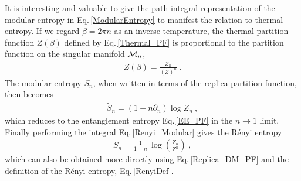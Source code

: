 It is interesting and valuable to give the path integral representation of the modular entropy in Eq.\,\eqref{ModularEntropy} to manifest the relation to thermal entropy.
If we regard $\beta = 2\pi n$ as an inverse temperature, the thermal partition function $Z(\beta)$ defined by Eq.\,\eqref{Thermal_PF} is proportional to the partition function on the singular manifold ${\cal M}_n$,
\begin{align}
	Z(\beta) = \frac{Z_n}{(Z)^n} \ .
\end{align}
The modular entropy $\tilde S_n$, when written in terms of the replica partition function, then becomes
\begin{align}
	\tilde S_n 	= (1- n\partial_n) \log Z_n \ ,
\end{align}
which reduces to the entanglement entropy Eq.\,\eqref{EE_PF} in the $n\to 1$ limit.
Finally performing the integral Eq.\,\eqref{Renyi_Modular} gives the R{\'e}nyi entropy
\begin{align}\label{Renyi_QFT}
	S_n = \frac{1}{1-n}\,\log \left(\frac{Z_n}{Z^n}\right) \ ,
\end{align}
which can also be obtained more directly using Eq.\,\eqref{Replica_DM_PF} and the definition of the R{\'e}nyi entropy, Eq.\,\eqref{RenyiDef}.




